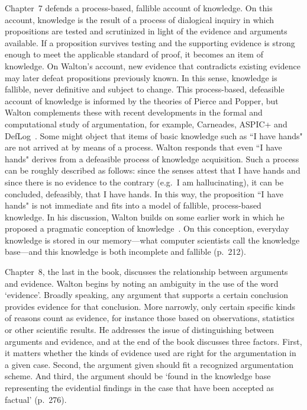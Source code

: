 \documentclass[12pt,a4paper]{article}
\begin{document}
Chapter~7 defends a process-based, fallible account of knowledge. On
this account, knowledge is the result of a process of dialogical inquiry in which
propositions are tested and scrutinized in light of the evidence and arguments
available. If a proposition survives testing and the supporting evidence is
strong enough to meet the applicable standard of proof, it becomes an item of
knowledge. On Walton's account, new evidence that contradicts existing evidence 
may later defeat propositions previously known. In this sense, 
knowledge is fallible, never definitive and subject to change. 
This process-based, defeasible
account of knowledge is informed by the theories of Pierce and Popper,
but Walton complements these with recent developments in the formal and computational study of argumentation,
for example, Carneades, ASPIC+ and DefLog~\citep{gordonEtal2007,prakken2010,verheij2005}. 
Some might object that items of basic knowledge such as ``I have hands"
are not arrived at by means of a process. Walton responds that even ``I
have hands" derives from a defeasible process of knowledge
acquisition. Such a process can be roughly described as follows: 
since the senses attest that I have hands 
and since there is no evidence to the contrary (e.g.\ I am hallucinating), it can be concluded, defeasibly,
that I have hands. In this way, the proposition ``I have hands" is not immediate and fits into a model of fallible, process-based
knowledge. In his discussion, Walton builds on some earlier work in which he proposed a pragmatic 
conception of knowledge~\citep{walton2005knowledge}. On this conception, 
everyday knowledge is stored in our memory---what computer scientists 
call the knowledge base---and this knowledge is both incomplete 
and fallible (p.\ 212).

Chapter~8, the last in the book, discusses the relationship between
arguments and evidence. Walton begins by noting an ambiguity in the
use of the word `evidence'. Broadly speaking, any argument that
supports a certain conclusion provides evidence for that conclusion. More
narrowly, only certain specific kinds of reasons count as evidence, for instance those based on observations, statistics or other scientific results. He addresses the issue of distinguishing between arguments and evidence, and at the end of the book discusses three factors. First, it matters whether the kinds of evidence used are right for the argumentation in a given case. Second, the argument given should fit a recognized argumentation scheme. And third, the argument should be `found in the knowledge base representing the evidential findings in the case that have been accepted as factual'
(p.\ 276).
\end{document}
